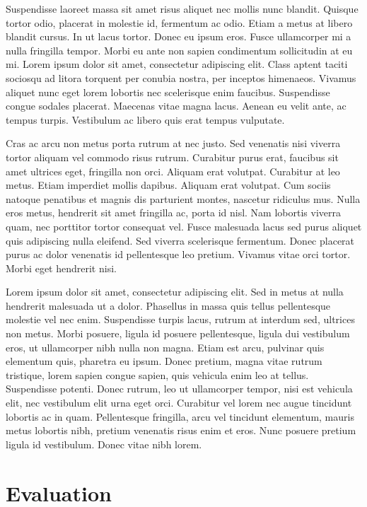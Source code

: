 \documentclass[12pt,twoside,notitlepage]{report}
\begin{document}
Suspendisse laoreet massa sit amet risus aliquet nec mollis nunc blandit. Quisque tortor odio, placerat in molestie id, fermentum ac odio. Etiam a metus at libero blandit cursus. In ut lacus tortor. Donec eu ipsum eros. Fusce ullamcorper mi a nulla fringilla tempor. Morbi eu ante non sapien condimentum sollicitudin at eu mi. Lorem ipsum dolor sit amet, consectetur adipiscing elit. Class aptent taciti sociosqu ad litora torquent per conubia nostra, per inceptos himenaeos. Vivamus aliquet nunc eget lorem lobortis nec scelerisque enim faucibus. Suspendisse congue sodales placerat. Maecenas vitae magna lacus. Aenean eu velit ante, ac tempus turpis. Vestibulum ac libero quis erat tempus vulputate.

Cras ac arcu non metus porta rutrum at nec justo. Sed venenatis nisi viverra tortor aliquam vel commodo risus rutrum. Curabitur purus erat, faucibus sit amet ultrices eget, fringilla non orci. Aliquam erat volutpat. Curabitur at leo metus. Etiam imperdiet mollis dapibus. Aliquam erat volutpat. Cum sociis natoque penatibus et magnis dis parturient montes, nascetur ridiculus mus. Nulla eros metus, hendrerit sit amet fringilla ac, porta id nisl. Nam lobortis viverra quam, nec porttitor tortor consequat vel. Fusce malesuada lacus sed purus aliquet quis adipiscing nulla eleifend. Sed viverra scelerisque fermentum. Donec placerat purus ac dolor venenatis id pellentesque leo pretium. Vivamus vitae orci tortor. Morbi eget hendrerit nisi.

Lorem ipsum dolor sit amet, consectetur adipiscing elit. Sed in metus at nulla hendrerit malesuada ut a dolor. Phasellus in massa quis tellus pellentesque molestie vel nec enim. Suspendisse turpis lacus, rutrum at interdum sed, ultrices non metus. Morbi posuere, ligula id posuere pellentesque, ligula dui vestibulum eros, ut ullamcorper nibh nulla non magna. Etiam est arcu, pulvinar quis elementum quis, pharetra eu ipsum. Donec pretium, magna vitae rutrum tristique, lorem sapien congue sapien, quis vehicula enim leo at tellus. Suspendisse potenti. Donec rutrum, leo ut ullamcorper tempor, nisi est vehicula elit, nec vestibulum elit urna eget orci. Curabitur vel lorem nec augue tincidunt lobortis ac in quam. Pellentesque fringilla, arcu vel tincidunt elementum, mauris metus lobortis nibh, pretium venenatis risus enim et eros. Nunc posuere pretium ligula id vestibulum. Donec vitae nibh lorem.

\cleardoublepage
\chapter{Evaluation}
\end{document}
